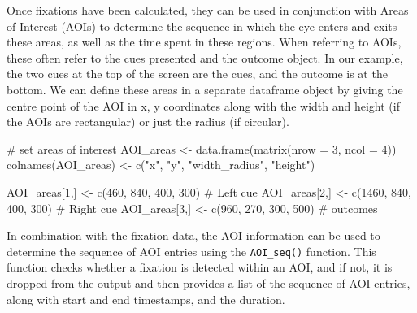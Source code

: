 \documentclass[
  man,
  floatsintext,
  longtable,
  nolmodern,
  notxfonts,
  notimes,
  colorlinks=true,linkcolor=blue,citecolor=blue,urlcolor=blue]{apa7}
\newenvironment{Shaded}{\begin{snugshade}}{\end{snugshade}}
\newcommand{\AttributeTok}[1]{\textcolor[rgb]{0.40,0.45,0.13}{#1}}
\newcommand{\CommentTok}[1]{\textcolor[rgb]{0.37,0.37,0.37}{#1}}
\newcommand{\DecValTok}[1]{\textcolor[rgb]{0.68,0.00,0.00}{#1}}
\newcommand{\FunctionTok}[1]{\textcolor[rgb]{0.28,0.35,0.67}{#1}}
\newcommand{\NormalTok}[1]{\textcolor[rgb]{0.00,0.23,0.31}{#1}}
\newcommand{\OtherTok}[1]{\textcolor[rgb]{0.00,0.23,0.31}{#1}}
\newcommand{\StringTok}[1]{\textcolor[rgb]{0.13,0.47,0.30}{#1}}
\begin{document}
Once fixations have been calculated, they can be used in conjunction
with Areas of Interest (AOIs) to determine the sequence in which the eye
enters and exits these areas, as well as the time spent in these
regions. When referring to AOIs, these often refer to the cues presented
and the outcome object. In our example, the two cues at the top of the
screen are the cues, and the outcome is at the bottom. We can define
these areas in a separate dataframe object by giving the centre point of
the AOI in x, y coordinates along with the width and height (if the AOIs
are rectangular) or just the radius (if circular).

\begin{Shaded}
\begin{Highlighting}[]
\CommentTok{\# set areas of interest}
\NormalTok{AOI\_areas }\OtherTok{\textless{}{-}} \FunctionTok{data.frame}\NormalTok{(}\FunctionTok{matrix}\NormalTok{(}\AttributeTok{nrow =} \DecValTok{3}\NormalTok{, }\AttributeTok{ncol =} \DecValTok{4}\NormalTok{))}
\FunctionTok{colnames}\NormalTok{(AOI\_areas) }\OtherTok{\textless{}{-}} \FunctionTok{c}\NormalTok{(}\StringTok{"x"}\NormalTok{, }\StringTok{"y"}\NormalTok{, }\StringTok{"width\_radius"}\NormalTok{, }\StringTok{"height"}\NormalTok{)}

\NormalTok{AOI\_areas[}\DecValTok{1}\NormalTok{,] }\OtherTok{\textless{}{-}} \FunctionTok{c}\NormalTok{(}\DecValTok{460}\NormalTok{, }\DecValTok{840}\NormalTok{, }\DecValTok{400}\NormalTok{, }\DecValTok{300}\NormalTok{) }\CommentTok{\# Left cue}
\NormalTok{AOI\_areas[}\DecValTok{2}\NormalTok{,] }\OtherTok{\textless{}{-}} \FunctionTok{c}\NormalTok{(}\DecValTok{1460}\NormalTok{, }\DecValTok{840}\NormalTok{, }\DecValTok{400}\NormalTok{, }\DecValTok{300}\NormalTok{) }\CommentTok{\# Right cue}
\NormalTok{AOI\_areas[}\DecValTok{3}\NormalTok{,] }\OtherTok{\textless{}{-}} \FunctionTok{c}\NormalTok{(}\DecValTok{960}\NormalTok{, }\DecValTok{270}\NormalTok{, }\DecValTok{300}\NormalTok{, }\DecValTok{500}\NormalTok{) }\CommentTok{\# outcomes}
\end{Highlighting}
\end{Shaded}

In combination with the fixation data, the AOI information can be used
to determine the sequence of AOI entries using the \texttt{AOI\_seq()}
function. This function checks whether a fixation is detected within an
AOI, and if not, it is dropped from the output and then provides a list
of the sequence of AOI entries, along with start and end timestamps, and
the duration.
\end{document}
